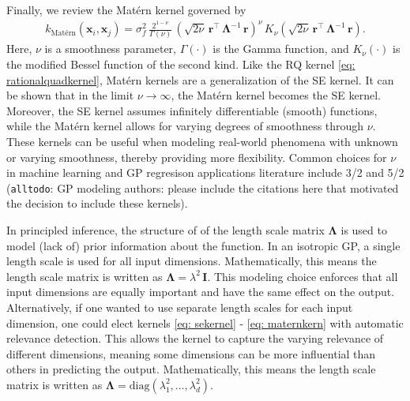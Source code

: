 \documentclass[journal=jacsat,manuscript=article]{achemso}
\newcommand{\alltodo}[1]{{\color{Cyan} (\texttt{alltodo}: #1)}}
\newcommand{\xvec}{\ensuremath{\mathbf{x}}}
\begin{document}
 Finally, we review the Mat\'ern kernel governed by
 \begin{gather}
     k_{\text{Mat\'ern}}(\xvec_i,\xvec_j) = \sigma_f^2 \,\frac{2^{1-\nu}}{\Gamma(\nu)} \, \left(\sqrt{2\nu} \, \mathbf{r}^\intercal \,\boldsymbol{\Lambda}^{-1} \,\mathbf{r} \right)^{\nu}\, K_\nu  \left(\sqrt{2\nu} \, \mathbf{r}^\intercal \,\boldsymbol{\Lambda}^{-1} \,\mathbf{r} \right). \label{eq: maternkern}
 \end{gather}
 Here, $\nu$ is a smoothness parameter, $\Gamma(\cdot)$ is the Gamma function, and $K_\nu(\cdot)$ is the modified Bessel function of the second kind. Like the RQ kernel \eqref{eq: rationalquadkernel}, Matérn kernels are a generalization of the SE kernel. It can be shown that in the limit $\nu \rightarrow \infty$, the Mat\'ern kernel becomes the SE kernel. Moreover, the SE kernel assumes infinitely differentiable (smooth) functions, while the Matérn kernel allows for varying degrees of smoothness through $\nu$. These kernels can be useful when modeling real-world phenomena with unknown or varying smoothness, thereby providing more flexibility. Common choices for $\nu$ in machine learning and GP regresison applications literature include 3/2 and 5/2 \alltodo{GP modeling authors: please include the citations here that motivated the decision to include these kernels}. 

 In principled inference, the structure of of the length scale matrix $\boldsymbol{\Lambda}$ is used to model (lack of) prior information about the function. In an isotropic GP, a single length scale is used for all input dimensions. Mathematically, this means the length scale matrix is written as $\boldsymbol{\Lambda} = \lambda^2 \, \mathbf{I}$. This modeling choice enforces that all input dimensions are equally important and have the same effect on the output. Alternatively, if one wanted to use separate length scales for each input dimension, one could elect kernels \eqref{eq: sekernel} - \eqref{eq: maternkern} with automatic relevance detection. This allows the kernel to capture the varying relevance of different dimensions, meaning some dimensions can be more influential than others in predicting the output. Mathematically, this means the length scale matrix is written as $\boldsymbol{\Lambda} = \text{diag}(\lambda_1^2,\dots,\lambda_d^2)$.
\end{document}

